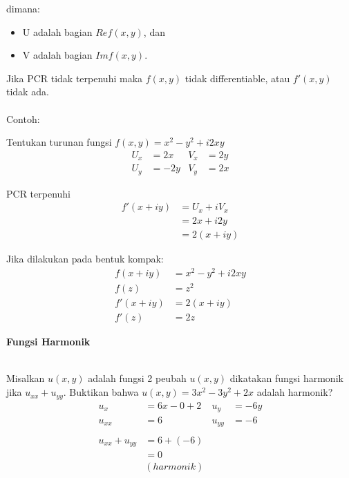 \documentclass{article}
\begin{document}
dimana:
\begin{itemize}
    \item U adalah bagian $Re f(x,y)$, dan
    \item V adalah bagian $Im f(x,y)$.
\end{itemize}

Jika PCR tidak terpenuhi maka $f(x,y)$ tidak differentiable, atau $f'(x,y)$ tidak ada.
\leavevmode\\ \\

Contoh:

Tentukan turunan fungsi $f(x,y) = x^2 -y^2 + i2xy$
\begin{align}
    U_x & = 2x  & V_x & = 2y
    \nonumber                \\
    U_y & = -2y & V_y & = 2x
    \nonumber
\end{align}

PCR terpenuhi
\begin{align}
    f'(x+iy) & = U_x +iV_x
    \nonumber              \\
             & = 2x +i2y
    \nonumber              \\
             & = 2(x+iy)
    \nonumber
\end{align}

Jika dilakukan pada bentuk kompak:
\begin{align}
    f(x+iy)  & = x^2 -y^2 + i2xy
    \nonumber                    \\
    f(z)     & = z^2
    \nonumber                    \\
    f'(x+iy) & = 2(x+iy)
    \nonumber                    \\
    f'(z)    & = 2z
    \nonumber
\end{align}



\newpage
\begin{center}
    \textbf{Fungsi Harmonik}
\end{center}
\leavevmode\\

Misalkan $u(x,y)$ adalah fungsi 2 peubah $u(x,y)$ dikatakan fungsi harmonik jika $u_{xx} + u_{yy}$. Buktikan bahwa $u(x,y) = 3x^2 - 3y^2 + 2x$ adalah harmonik?
\begin{align}
    u_x             & = 6x-0+2   & u_y    & = -6y
    \nonumber                                     \\
    u_{xx}          & = 6        & u_{yy} & = -6
    \nonumber                                     \\
    \nonumber                                     \\
    u_{xx} + u_{yy} & = 6 + (-6)
    \nonumber                                     \\
                    & = 0
    \nonumber                                     \\
                    & (harmonik)
    \nonumber
\end{align}
\end{document}
